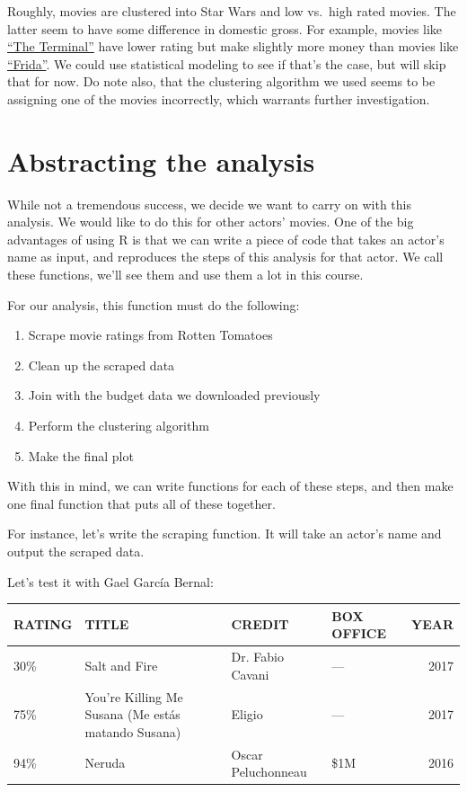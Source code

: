 \documentclass[]{book}
\providecommand{\tightlist}{%
  \setlength{\itemsep}{0pt}\setlength{\parskip}{0pt}}
\theoremstyle{definition}
\theoremstyle{definition}
\theoremstyle{remark}
\begin{document}
Roughly, movies are clustered into Star Wars and low vs.~high rated
movies. The latter seem to have some difference in domestic gross. For
example, movies like
\href{https://www.rottentomatoes.com/m/1133499_1133499_terminal}{``The
Terminal''} have lower rating but make slightly more money than movies
like \href{https://www.rottentomatoes.com/m/frida}{``Frida''}. We could
use statistical modeling to see if that's the case, but will skip that
for now. Do note also, that the clustering algorithm we used seems to be
assigning one of the movies incorrectly, which warrants further
investigation.

\section{Abstracting the analysis}\label{abstracting-the-analysis}

While not a tremendous success, we decide we want to carry on with this
analysis. We would like to do this for other actors' movies. One of the
big advantages of using R is that we can write a piece of code that
takes an actor's name as input, and reproduces the steps of this
analysis for that actor. We call these functions, we'll see them and use
them a lot in this course.

For our analysis, this function must do the following:

\begin{enumerate}
\def\labelenumi{\arabic{enumi}.}
\tightlist
\item
  Scrape movie ratings from Rotten Tomatoes
\item
  Clean up the scraped data
\item
  Join with the budget data we downloaded previously
\item
  Perform the clustering algorithm
\item
  Make the final plot
\end{enumerate}

With this in mind, we can write functions for each of these steps, and
then make one final function that puts all of these together.

For instance, let's write the scraping function. It will take an actor's
name and output the scraped data.

Let's test it with Gael García Bernal:

\begin{tabular}{l|l|l|l|r}
\hline
RATING & TITLE & CREDIT & BOX OFFICE & YEAR\\
\hline
30\% & Salt and Fire & Dr. Fabio Cavani & — & 2017\\
\hline
75\% & You're Killing Me Susana (Me estás matando Susana) & Eligio & — & 2017\\
\hline
94\% & Neruda & Oscar Peluchonneau & \$1M & 2016\\
\hline
\end{tabular}
\end{document}
